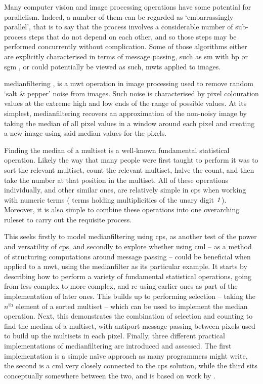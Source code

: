 Many computer vision and image processing operations have some potential for parallelism.  Indeed, a number of them can be regarded as `embarrassingly parallel', that is to say that the process involves a considerable number of sub-process steps that do not depend on each other, and so those steps may be performed concurrently without complication.  Some of those algorithms either are explicitly characterised in terms of message passing, such as \gls{sm} with \gls{bp} \cite{Liang2011} or \gls{sgm} \cite{Drory2014}, or could potentially be viewed as such, \eg{} \glspl{mwt} applied to images.

\Gls{medianfilter}ing \cite[Chap. 3.4.1]{Gimelfarb2018}, \cite{Fisher2016} is a \gls{mwt} operation in image processing used to remove random `salt \& pepper' noise from images.  Such noise is characterised by pixel colouration values at the extreme high and low ends of the range of possible values.  At its simplest, \gls{medianfilter}ing recovers an approximation of the non-noisy image by taking the median of all pixel values in a window around each pixel and creating a new image using said median values for the pixels.

Finding the median of a multiset is a well-known fundamental statistical operation.  Likely the way that many people were first taught to perform it was to sort the relevant multiset, count the relevant multiset, halve the count, and then take the number at that position in the multiset.  All of these operations individually, and other similar ones, are relatively simple in \gls{cps} when working with numeric terms (\ie{} terms holding multiplicities of the unary digit \(\mathit{1}\)).  Moreover, it is also simple to combine these operations into one overarching \gls{ruleset} to carry out the requisite process.

This  seeks firstly to model \gls{medianfilter}ing using \gls{cps}, as another test of the power and versatility of \gls{cps}, and secondly to explore whether using \gls{cml} -- as a method of structuring computations around message passing -- could be beneficial when applied to a \gls{mwt}, using the \gls{medianfilter} as its particular example.  It starts by describing how to perform a variety of fundamental statistical operations, going from less complex to more complex, and re-using earlier ones as part of the implementation of later ones.  This builds up to performing selection -- taking the \(n^{\text{th}}\) element of a sorted multiset -- which can be used to implement the median operation.  Next, this  demonstrates the combination of selection and counting to find the median of a multiset, with antiport message passing between pixels used to build up the multisets in each pixel.  Finally, three different practical implementations of \gls{medianfilter}ing are introduced and assessed.  The first implementation is a simple naïve approach as many programmers might write, the second is a \gls{cml} very closely connected to the \gls{cps} solution, while the third sits conceptually somewhere between the two, and is based on work by \citeauthor{Braunl2001} \cite{Braunl2001}.

